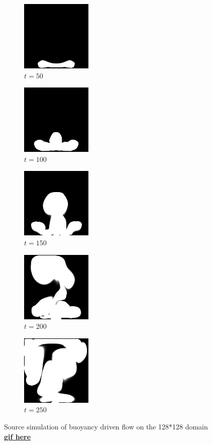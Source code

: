 \documentclass[a4paper,12pt,twoside]{report}
\begin{document}
\begin{figure}
	\centering
	\begin{subfigure}{0.18\textwidth}
		\centering
		\includegraphics[scale=0.56]{buoyancy_test/dens_000050_src.png}
		\caption{$t=50$}
	\end{subfigure}
	\begin{subfigure}{0.18\textwidth}
		\centering
		\includegraphics[scale=0.56]{buoyancy_test/dens_000100_src.png}
		\caption{$t=100$}
	\end{subfigure}
	\begin{subfigure}{0.18\textwidth}
		\centering
		\includegraphics[scale=0.56]{buoyancy_test/dens_000150_src.png}
		\caption{$t=150$}
	\end{subfigure}
	\begin{subfigure}{0.18\textwidth}
		\centering
		\includegraphics[scale=0.56]{buoyancy_test/dens_000200_src.png}
		\caption{$t=200$}
	\end{subfigure}
	\begin{subfigure}{0.18\textwidth}
		\centering
		\includegraphics[scale=0.56]{buoyancy_test/dens_000249_src.png}
		\caption{$t=250$}
	\end{subfigure}
	\caption{Source simulation of buoyancy driven flow on the 128*128 domain \href{https://github.com/w191444052/sol-data/blob/master/buoyancy_high/source.gif}{\bf{gif here}}}
	\label{sol buoyancy high source}
\end{figure}
\end{document}
